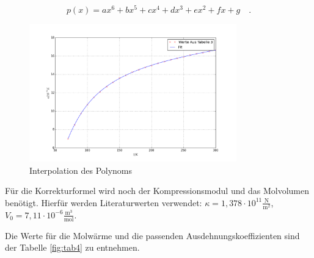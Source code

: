\begin{equation*}
p(x)=ax^6+bx^5+cx^4+dx^3+ex^2+fx+g\quad.
\end{equation*}

\begin{figure}
	\centering
		\includegraphics[width=0.8\textwidth]{inter.png}
	\caption{Interpolation des Polynoms}
	\label{fig:abb1}
\end{figure}

\noindent Für die Korrekturformel wird noch der Kompressionsmodul und das Molvolumen benötigt. Hierfür werden Literaturwerten verwendet: \(\kappa=1,378\cdot10^{11}\frac{\text{N}}{\text{m}^2}\), \(V_0=7,11\cdot10^{-6}\frac{\text{m}^3}{\text{mol}}\). 

\noindent Die Werte für die Molwärme und die passenden Ausdehnungskoeffizienten sind der Tabelle \ref{fig:tab4} zu entnehmen.

